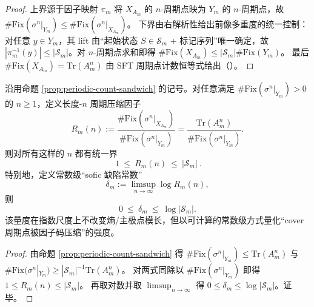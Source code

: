 \begin{proof}
上界源于因子映射 \(\pi_m\) 将 \(X_{A_m}\) 的 \(n\)-周期点映为 \(Y_m\) 的 \(n\)-周期点，故 \(\#\mathrm{Fix}(\sigma^n|_{Y_m})\le \#\mathrm{Fix}(\sigma^n|_{X_{A_m}})\)。
下界由右解析性给出前像多重度的统一控制：对任意 $y\in Y_m$，其 lift 由“起始状态 $S\in\mathcal{S}_m$ + 标记序列”唯一确定，故 $|\pi_m^{-1}(y)|\le |\mathcal{S}_m|$。对 $n$-周期点求和即得
\(\#\mathrm{Fix}(X_{A_m})\le |\mathcal{S}_m|\#\mathrm{Fix}(Y_m)\)。
最后 \(\#\mathrm{Fix}(X_{A_m})=\mathrm{Tr}(A_m^n)\) 由 SFT 周期点计数恒等式给出（\cite{LindMarcus1995}）。
\end{proof}

\begin{corollary}\label{cor:Ym-periodic-compression-ratio}
沿用命题 \ref{prop:periodic-count-sandwich} 的记号。对任意满足 \(\#\mathrm{Fix}(\sigma^n|_{Y_m})>0\) 的 \(n\ge 1\)，定义长度-\(n\) 周期压缩因子
\[
R_m(n):=\frac{\#\mathrm{Fix}(\sigma^n|_{X_{A_m}})}{\#\mathrm{Fix}(\sigma^n|_{Y_m})}
=\frac{\mathrm{Tr}(A_m^n)}{\#\mathrm{Fix}(\sigma^n|_{Y_m})}.
\]
则对所有这样的 \(n\) 都有统一界
\[
\boxed{\ 1\ \le\ R_m(n)\ \le\ |\mathcal{S}_m|\ }.
\]
特别地，定义常数级“sofic 缺陷常数”
\[
\delta_m:=\limsup_{n\to\infty}\log R_m(n),
\]
则
\[
0\ \le\ \delta_m\ \le\ \log|\mathcal{S}_m|.
\]
该量度在指数尺度上不改变熵/主极点模长，但以可计算的常数级方式量化“cover 周期点被因子码压缩”的强度。
\end{corollary}

\begin{proof}
由命题 \ref{prop:periodic-count-sandwich} 得
\(
\#\mathrm{Fix}(\sigma^n|_{Y_m})\le \mathrm{Tr}(A_m^n)
\)
与
\(
\#\mathrm{Fix}(\sigma^n|_{Y_m})\ge |\mathcal{S}_m|^{-1}\mathrm{Tr}(A_m^n)
\)。
对两式同除以 \(\#\mathrm{Fix}(\sigma^n|_{Y_m})\) 即得 \(1\le R_m(n)\le |\mathcal{S}_m|\)。
再取对数并取 \(\limsup_{n\to\infty}\) 得 \(0\le \delta_m\le \log|\mathcal{S}_m|\)。证毕。
\end{proof}

